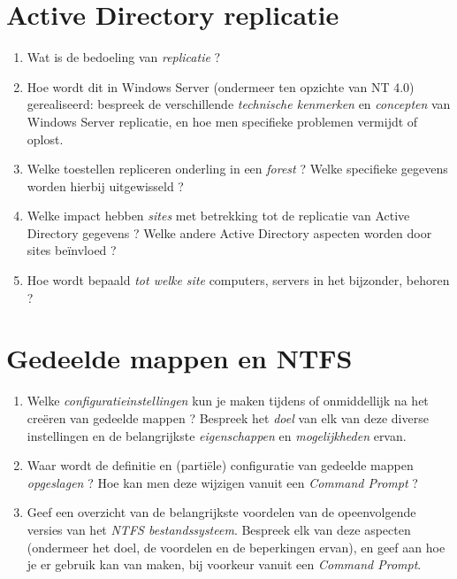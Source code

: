 \documentclass{report}
\begin{document}
	\section{Active Directory replicatie }
	\begin{enumerate}
		\item Wat is de bedoeling van \textit{replicatie} ?
		
		\item Hoe wordt dit in Windows Server (ondermeer ten opzichte van NT 4.0) gerealiseerd: bespreek de verschillende \textit{technische kenmerken} en \textit{concepten} van Windows Server replicatie, en hoe men specifieke problemen vermijdt of oplost.
		
		\item Welke toestellen repliceren onderling in een \textit{forest} ? Welke specifieke gegevens worden hierbij uitgewisseld ?
		
		\item Welke impact hebben \textit{sites} met betrekking tot de replicatie van Active Directory gegevens ? Welke andere Active Directory aspecten worden door sites beïnvloed ? 
		
		\item Hoe wordt bepaald \textit{tot welke site} computers, servers in het bijzonder, behoren ? 
	\end{enumerate}

	\section{Gedeelde mappen en NTFS}
	\begin{enumerate}
		\item Welke \textit{configuratieinstellingen} kun je maken tijdens of onmiddellijk na het creëren van gedeelde mappen ? Bespreek het \textit{doel} van elk van deze diverse instellingen en de belangrijkste \textit{eigenschappen} en \textit{mogelijkheden} ervan. 
		
		\item Waar wordt de definitie en (partiële) configuratie van gedeelde mappen \textit{opgeslagen} ? Hoe kan men deze wijzigen vanuit een \textit{Command Prompt} ? 
		
		\item Geef een overzicht van de belangrijkste voordelen van de opeenvolgende versies van het \textit{NTFS bestandssysteem}. Bespreek elk van deze aspecten (ondermeer het doel, de voordelen en de beperkingen ervan), en geef aan hoe je er gebruik kan van maken, bij voorkeur vanuit een \textit{Command Prompt}. 
	\end{enumerate}
\end{document}
